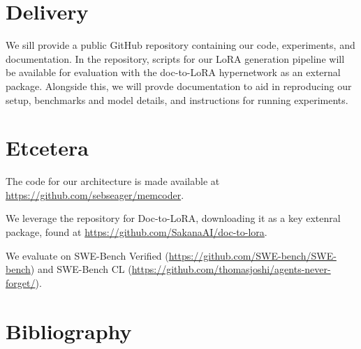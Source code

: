 \documentclass{article}
\begin{document}
\section{Delivery}

We sill provide a public GitHub repository containing our code, experiments, and documentation. In the repository, scripts for our LoRA generation pipeline will be available for evaluation with the doc-to-LoRA hypernetwork as an external package. Alongside this, we will provde documentation to aid in reproducing our setup, benchmarks and model details, and instructions for running experiments.

\section{Etcetera}

The code for our architecture is made available at \url{https://github.com/sebseager/memcoder}. 

We leverage the repository for Doc-to-LoRA, downloading it as a key extenral package, found at \url{https://github.com/SakanaAI/doc-to-lora}. 

We evaluate on SWE-Bench Verified (\url{https://github.com/SWE-bench/SWE-bench}) and SWE-Bench CL (\url{https://github.com/thomasjoshi/agents-never-forget/}).

\section{Bibliography}

\printbibliography
\end{document}
